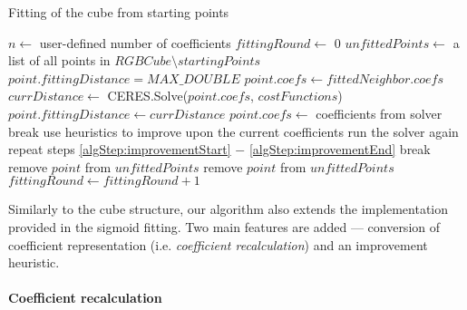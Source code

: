 \begin{algorithm}[t!]
	\caption{Fitting of the cube from starting points}
	\label{alg:upliftingAlgMoments}
	\begin{algorithmic}[1]
		\State $n \gets $ user-defined number of coefficients
		\State $fittingRound \gets$ $0$
		\State $unfittedPoints \gets$ a list of all points in $RGBCube \setminus startingPoints$
		\State $point.fittingDistance = MAX\_DOUBLE$
		\EndFor
		\State $point.coefs \gets fittedNeighbor.coefs$
		 \label{algStep:conversionBegin}
		 \label{algStep:conversionEnd}
		\EndIf 
		\State $currDistance \gets $ CERES.Solve($point.coefs$, $costFunctions$)
		 \label{algStep:improvementStart}
		\State $point.fittingDistance \gets currDistance$
		\State $point.coefs \gets $ coefficients from solver
		\EndIf
		\State break
		\EndIf \label{algStep:improvementEnd}
		\EndFor
		 \label{algStep:heuristicsStart}
		\State use heuristics to improve upon the current coefficients
		\State run the solver again
		\State repeat steps \ref{algStep:improvementStart} $-$ \ref{algStep:improvementEnd}
		\State break \label{algStep:heuristicsEnd}
		\EndIf
		\EndWhile
		\State remove $point$ from $unfittedPoints$
		\EndIf
		\State remove $point$ from $unfittedPoints$
		\EndIf
		\EndFor	
		\State $fittingRound \gets fittingRound+1$
		\EndWhile
	\end{algorithmic}
\end{algorithm}

Similarly to the cube structure, our algorithm also extends the implementation provided in the sigmoid fitting. Two main features are added --- conversion of coefficient representation (i.e. \emph{coefficient recalculation}) and an improvement heuristic.

\paragraph{Coefficient recalculation}

